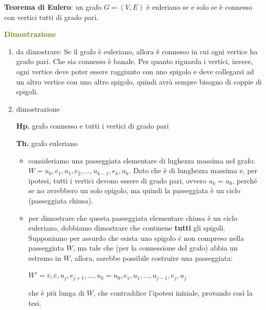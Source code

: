 \begin{flushleft}
    \textbf{Teorema di Eulero}: un grafo $G = (V, E)$ è euleriano se e solo se è connesso con vertici tutti di grado pari.

    \begin{boxA}
        \textcolor{olive}{\textbf{Dimostrazione}}
        \begin{enumerate}[nosep]
            \item da dimostrare: Se il grafo è euleriano, allora è connesso in cui ogni vertice ha grado pari. Che sia connesso è banale. Per quanto riguarda i vertici, invece, ogni vertice deve poter essere raggiunto con uno spigolo e deve collegarsi ad un altro vertice con uno altro spigolo, quindi avrà sempre bisogno di coppie di spigoli.
            \item dimostrazione

            \begin{center}
                \begin{minipage}[t]{0.45\textwidth}
                    \centering
                    \textbf{Hp.} grafo connesso e tutti i vertici di grado pari
                \end{minipage}
                \begin{minipage}[t]{0.45\textwidth}
                    \centering
                    \textbf{Th.} grafo euleriano
                \end{minipage}
            \end{center}
            
            \begin{itemize}[nosep]
                \item consideriamo una passeggiata elementare di lughezza massima nel grafo: $W = u_0, e_1, u_1, e_2, ..., u_{k-1}, e_k, u_k$. Dato che è di lunghezza massima e, per ipotesi, tutti i vertici devono essere di grado pari, ovvero $u_k = u_0$, perché se no avrebbero un solo spigolo, ma quindi la passeggiata è un ciclo (passeggiata chiusa).
                \item per dimostrare che questa passeggiata elementare chiusa è un ciclo euleriano, dobbiamo dimostrare che continene \textbf{tutti} gli spigoli. Supponiamo per assurdo che esista uno spigolo $\overline{e}$ non compreso nella passeggiata $W$, ma tale che (per la connessione del grafo) abbia un estremo in $W$, allora, sarebbe possibile costruire una passeggiata:

                {\centering
                    $W' = \overline{v}, \overline{e}, u_j, e_{j+1}, ..., u_k = u_0, e_1, u_1, ..., u_{j-1}, e_j, u_j$
                \par}
                che è più lunga di $W$, che contraddice l'ipotesi iniziale, provando così la tesi.
            \end{itemize}
        \end{enumerate}
    \end{boxA}
\end{flushleft}